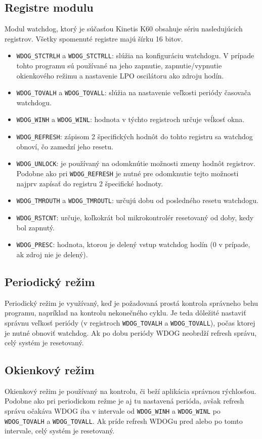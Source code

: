 \documentclass[12pt,a4paper,titlepage,final]{article}
\begin{document}
\subsection{Registre modulu}
Modul watchdog, ktorý je súčasťou Kinetis K60 obsahuje sériu nasledujúcich registrov. Všetky spomenuté registre majú šírku 16 bitov.
\begin{itemize}
    \item \verb|WDOG_STCTRLH| a \verb|WDOG_STCTRLL|: slúžia na konfiguráciu watchdogu. V prípade tohto programu sú používané na jeho zapnutie, zapnutie/vypnutie okienkového režimu a nastavenie LPO oscilátoru ako zdroju hodín.
    \item \verb|WDOG_TOVALH| a \verb|WDOG_TOVALL|: slúžia na nastavenie veľkosti periódy časovača watchdogu.
    \item \verb|WDOG_WINH| a \verb|WDOG_WINL|: hodnota v týchto registroch určuje veĺkosť okna.
    \item \verb|WDOG_REFRESH|: zápisom 2 špecifických hodnôt do tohto registru sa watchdog obnoví, čo zamedzí jeho resetu.
    \item \verb|WDOG_UNLOCK|: je používaný na odomknútie možnosti zmeny hodnôt registrov. Podobne ako pri \verb|WDOG_REFRESH| je nutné pre odomknutie tejto možnosti najprv zapísať do registru 2 špecifické hodnoty.
    \item \verb|WDOG_TMROUTH| a \verb|WDOG_TMROUTL|: určujú dobu od posledného resetu watchdogu.
    \item \verb|WDOG_RSTCNT|: určuje, koľkokrát bol mikrokontrolér resetovaný od doby, kedy bol zapnutý.
    \item \verb|WDOG_PRESC|: hodnota, ktorou je delený vstup watchdog hodín (0 v prípade, ak zdroj nie je delený).
\end{itemize}

\subsection{Periodický režim}
Periodický režim je využívaný, keď je požadovaná prostá kontrola správneho behu programu, napríklad na kontrolu nekonečného cyklu. Je teda dôležité nastaviť správnu veľkosť periódy (v registroch \verb|WDOG_TOVALH| a \verb|WDOG_TOVALL|), počas ktorej je nutné obnoviť watchdog. Ak po dobu periódy WDOG neobrdží refresh správu, celý systém je resetovaný.

\subsection{Okienkový režim}
Okienkový režim je používaný na kontrolu, či beží aplikácia správnou rýchlosťou. Podobne ako pri periodickom režme je aj tu nastavená perióda, avšak refresh správu očakáva WDOG iba v intervale od \verb|WDOG_WINH| a \verb|WDOG_WINL| po \verb|WDOG_TOVALH| a \verb|WDOG_TOVALL|. Ak príde refresh WDOGu pred alebo po tomto intervale, celý systém je resetovaný.
\end{document}
